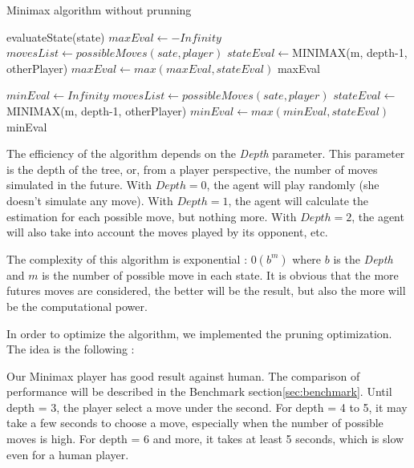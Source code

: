 \documentclass{article}
\begin{document}
\begin{algorithm}[H] %
	\caption{Minimax algorithm without prunning}
    \label{alg:minimax}
	\begin{algorithmic}[1]
	            \Return evaluateState(state)
	       \EndIf
    	        \State $maxEval \gets -Infinity$
    	        \State $movesList \gets possibleMoves(sate, player)$
    	                \State $stateEval \gets $MINIMAX(m, depth-1, otherPlayer)
                        \State $maxEval \gets max(maxEval, stateEval)$
    	       \EndFor
    	       \State \Return maxEval

	       \Else
	            \State $minEval \gets Infinity$
    	        \State $movesList \gets possibleMoves(sate, player)$
    	       	     \State $stateEval \gets $ MINIMAX(m, depth-1, otherPlayer)
                     \State $minEval \gets max(minEval, stateEval)$
    	       \EndFor
    	       \State \Return minEval
	       \EndIf

	      \EndFunction

	\end{algorithmic}
\end{algorithm}
The efficiency of the algorithm depends on the \textit{Depth} parameter. This parameter is the depth of the tree, or, from a player perspective, the number of moves simulated in the future. With $Depth = 0$, the agent will play randomly (she doesn't simulate any move).
With $Depth = 1$, the agent will calculate the estimation for each possible move, but nothing more. With $Depth = 2$, the agent will also take into account the moves played by its opponent, etc.

The complexity of this algorithm is exponential : $0(b^m)$ where $b$ is the \textit{Depth} and $m$ is the number of possible move in each state.
It is obvious that the more futures moves are considered, the better will be the result, but also the more will be the computational power.

In order to optimize the algorithm, we implemented the pruning optimization. The idea is the following :

Our Minimax player has good result against human. The comparison of performance will be described in the Benchmark section\ref{sec:benchmark}.
Until depth = 3, the player select a move under the second.
For depth = 4 to 5, it may take a few seconds to choose a move, especially when the number of possible moves is high.
For depth = 6 and more, it takes at least 5 seconds, which is slow even for a human player.
\end{document}
